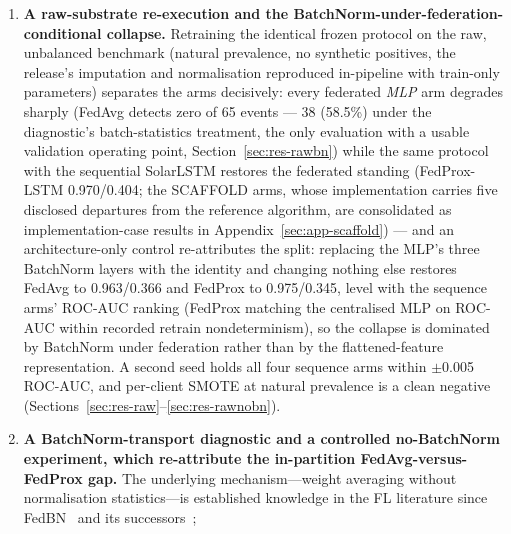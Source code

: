 \begin{enumerate}[leftmargin=2em, itemsep=3pt]
  temporally-preceding fold (training partitions 1--4, single-pass
  test on partition 5, natural 1.31\% prevalence), all arms
  generalise (ROC-AUC 0.906--0.978); the in-partition
  federated-versus-centralised gap disappears (FedProx 0.976/0.308
  vs architecture-matched centralised MLP 0.973/0.382); the
  threshold-transfer and calibration failures persist; and an
  event-level evaluation on 65 physical M/X-class events shows
  detection is not the deployability boundary---XGBoost's false-alarm
  burden is roughly $7\times$ lower than every neural arm's
  (Section~\ref{sec:res-leakfree}).
  \item \textbf{A raw-substrate re-execution and the
  BatchNorm-under-federation-conditional collapse.} Retraining the
  identical frozen protocol on the raw, unbalanced benchmark (natural
  prevalence, no synthetic positives, the
  release's imputation and normalisation reproduced in-pipeline with
  train-only parameters) separates the arms decisively: every
  federated \emph{MLP} arm degrades sharply (FedAvg detects zero of 65
  events --- 38 (58.5\%) under the diagnostic's batch-statistics
  treatment, the only evaluation with a usable validation operating
  point, Section~\ref{sec:res-rawbn}) while the same protocol with the
  sequential SolarLSTM restores the federated standing (FedProx-LSTM
  0.970/0.404; the SCAFFOLD arms, whose implementation carries five
  disclosed departures from the reference algorithm, are consolidated
  as implementation-case results in Appendix~\ref{sec:app-scaffold})
  --- and an
  architecture-only control re-attributes the split: replacing the
  MLP's three BatchNorm layers with the identity and changing nothing
  else restores FedAvg to 0.963/0.366 and FedProx to 0.975/0.345, level
  with the sequence arms' ROC-AUC ranking (FedProx matching the
  centralised MLP on ROC-AUC within recorded retrain
  nondeterminism), so the collapse is dominated by BatchNorm under
  federation rather than by the flattened-feature representation.
  A second seed
  holds all four sequence arms within $\pm$0.005 ROC-AUC, and
  per-client SMOTE at natural prevalence is a clean negative
  (Sections~\ref{sec:res-raw}--\ref{sec:res-rawnobn}).
  \item \textbf{A BatchNorm-transport diagnostic and a controlled
  no-BatchNorm experiment, which re-attribute the in-partition
  FedAvg-versus-FedProx gap.} The underlying mechanism---weight
  averaging without normalisation statistics---is established
  knowledge in the FL literature since FedBN~\cite{li2021fedbn} and
  its successors~\cite{wang2023bn,guerraoui2024bn,bnscaffold2024};

\end{enumerate}
